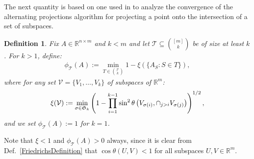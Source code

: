 \documentclass[journal, twocolumn]{IEEEtran}
\newtheorem{definition}{Definition}
\begin{document}

The next quantity is based on one used in \cite{Deutsch12} to analyze the convergence of the alternating projections algorithm for projecting a point onto the intersection of a set of subspaces.

\begin{definition}\label{SpecialSupportSet}
Fix $A \in \mathbb{R}^{n \times m}$ and $k < m$ and let $\mathcal{T} \subseteq {[m] \choose k}$ be of size at least $k$. For $k > 1$, define:
\begin{align*}
\phi_\mathcal{T}(A) :=  \min_{T \in {\mathcal{T} \choose k}} 1 - \xi( \{ A_{S}: S \in T\}),
\end{align*}
where for any set $\mathcal{V} = \{V_1, \ldots, V_k\}$ of subspaces of $\mathbb{R}^m$:
\begin{align*}
\xi(\mathcal{V}) := \min_{\sigma \in \frak{S}_k} \left(1 -  \prod_{i=1}^{k-1} \sin^2  \theta \left(V_{\sigma(i)}, \cap_{j>i} V_{\sigma(j)} \right)  \right)^{1/2},
\end{align*} 
%
and we set $\phi_\mathcal{T}(A) := 1$ for $k=1$.
\end{definition}
Note that $\xi < 1$ and  $\phi_\mathcal{T}(A) > 0$ always, since it is clear from Def.~\ref{FriedrichsDefinition} that $\cos\theta(U,V) < 1$ for all subspaces $U,V \in \mathbb{R}^m$. 
\end{document}
